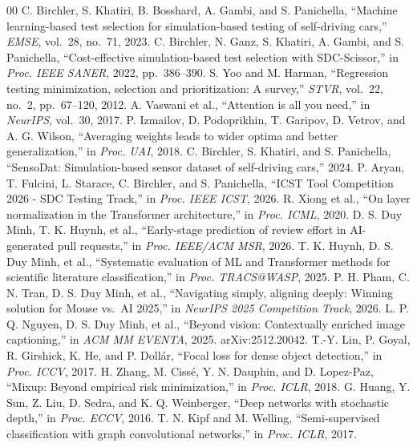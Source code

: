 ﻿\documentclass[conference]{IEEEtran}
\begin{document}
\begin{thebibliography}{00}
 C. Birchler, S. Khatiri, B. Bosshard, A. Gambi, and S. Panichella, ``Machine learning-based test selection for simulation-based testing of self-driving cars,'' \textit{EMSE}, vol.~28, no.~71, 2023.
 C. Birchler, N. Ganz, S. Khatiri, A. Gambi, and S. Panichella, ``Cost-effective simulation-based test selection with SDC-Scissor,'' in \textit{Proc. IEEE SANER}, 2022, pp.~386--390.
 S. Yoo and M. Harman, ``Regression testing minimization, selection and prioritization: A survey,'' \textit{STVR}, vol.~22, no.~2, pp.~67--120, 2012.
 A. Vaswani et al., ``Attention is all you need,'' in \textit{NeurIPS}, vol.~30, 2017.
 P. Izmailov, D. Podoprikhin, T. Garipov, D. Vetrov, and A. G. Wilson, ``Averaging weights leads to wider optima and better generalization,'' in \textit{Proc. UAI}, 2018.
 C. Birchler, S. Khatiri, and S. Panichella, ``SensoDat: Simulation-based sensor dataset of self-driving cars,'' 2024.
 P. Aryan, T. Fulcini, L. Starace, C. Birchler, and S. Panichella, ``{ICST} Tool Competition 2026 - SDC Testing Track,'' in \textit{Proc. IEEE ICST}, 2026.
 R. Xiong et al., ``On layer normalization in the Transformer architecture,'' in \textit{Proc. ICML}, 2020.
 D. S. Duy Minh, T. K. Huynh, et al., ``Early-stage prediction of review effort in AI-generated pull requests,'' in \textit{Proc. IEEE/ACM MSR}, 2026.
 T. K. Huynh, D. S. Duy Minh, et al., ``Systematic evaluation of ML and Transformer methods for scientific literature classification,'' in \textit{Proc. TRACS@WASP}, 2025.
 P. H. Pham, C. N. Tran, D. S. Duy Minh, et al., ``Navigating simply, aligning deeply: Winning solution for Mouse vs.\ AI 2025,'' in \textit{NeurIPS 2025 Competition Track}, 2026.
 L. P. Q. Nguyen, D. S. Duy Minh, et al., ``Beyond vision: Contextually enriched image captioning,'' in \textit{ACM MM EVENTA}, 2025. arXiv:2512.20042.
 T.-Y. Lin, P. Goyal, R. Girshick, K. He, and P. Doll\'ar, ``Focal loss for dense object detection,'' in \textit{Proc. ICCV}, 2017.
 H. Zhang, M. Ciss\'{e}, Y. N. Dauphin, and D. Lopez-Paz, ``Mixup: Beyond empirical risk minimization,'' in \textit{Proc. ICLR}, 2018.
 G. Huang, Y. Sun, Z. Liu, D. Sedra, and K. Q. Weinberger, ``Deep networks with stochastic depth,'' in \textit{Proc. ECCV}, 2016.
 T. N. Kipf and M. Welling, ``Semi-supervised classification with graph convolutional networks,'' in \textit{Proc. ICLR}, 2017.
\end{thebibliography}
\end{document}
